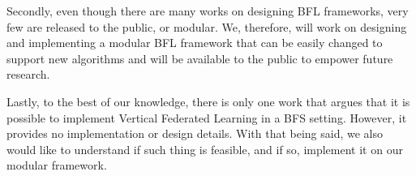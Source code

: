 Secondly, even though there are many works on designing BFL frameworks, very few are released to the public, or modular. We, therefore, will work on designing and implementing a modular BFL framework that can be easily changed to support new algorithms and will be available to the public to empower future research.

Lastly, to the best of our knowledge, there is only one work \cite{10.48550/arxiv.1912.04859} that argues that it is possible to implement Vertical Federated Learning in a BFS setting. However, it provides no implementation or design details. With that being said, we also would like to understand if such thing is feasible, and if so, implement it on our modular framework.




